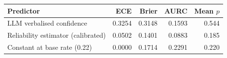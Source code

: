 \begin{tabular}{lrrrr}
\toprule
Predictor & ECE & Brier & AURC & Mean $p$ \\
\midrule
LLM verbalised confidence & 0.3254 & 0.3148 & 0.1593 & 0.544 \\
Reliability estimator (calibrated) & 0.0502 & 0.1401 & 0.0883 & 0.185 \\
Constant at base rate (0.22) & 0.0000 & 0.1714 & 0.2291 & 0.220 \\
\bottomrule
\end{tabular}
